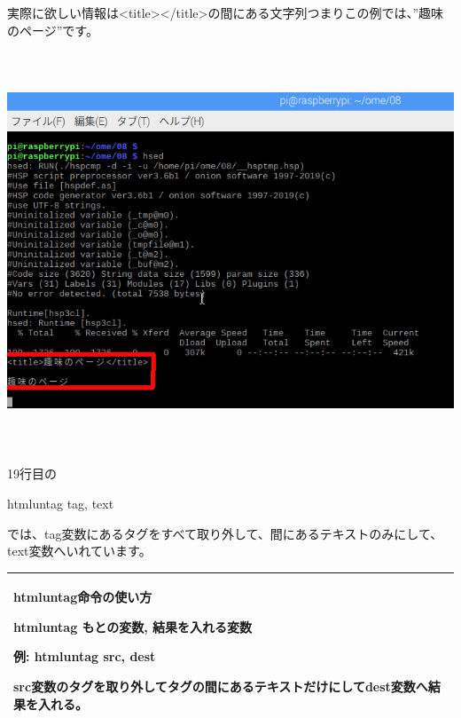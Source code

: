\documentclass[a4paper,12pt,dvipdfmx]{jarticle}
\begin{document}
実際に欲しい情報は{\textless}title{\textgreater}{\textless}/title{\textgreater}の間にある文字列つまりこの例では、”趣味のページ”です。



\begin{center}
\includegraphics[width=15.411cm,height=11.841cm]{textbook-img015.png}

\end{center}


\bigskip


\bigskip

\clearpage
19行目の

htmluntag tag, text

では、tag変数にあるタグをすべて取り外して、間にあるテキストのみにして、text変数へいれています。


\bigskip

\begin{center}
\tablefirsthead{}
\tablehead{}
\tabletail{}
\tablelasttail{}
\begin{supertabular}{|m{16.806cm}|}
\hline
htmluntag命令の使い方

{\bfseries htmluntag もとの変数, 結果を入れる変数}

例: htmluntag src, dest

src変数のタグを取り外してタグの間にあるテキストだけにしてdest変数へ結果を入れる。\\\hline
\end{supertabular}
\end{center}
\end{document}
